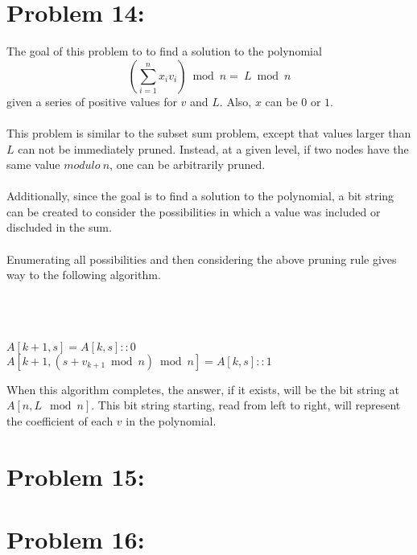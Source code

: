 \documentclass[12pt]{article}
\begin{document}
\section*{Problem 14: }
The goal of this problem to to find a 
solution to the polynomial \[\left(\sum_{i=1}^{n}x_iv_i\right)\bmod n=\ L\bmod n\]
given a series of positive values for $v$ and $L$.  Also, $x$
can be $0$ or $1$.\\\\  
This problem is similar to the subset sum problem, except that
values larger than $L$ can not be immediately pruned.
Instead, at a given level, if two nodes have the same value 
$modulo\ n$, one can be arbitrarily pruned.\\\\
Additionally, since the goal is to find a solution to the
polynomial, a bit string can be created to consider the
possibilities in which a value was included or discluded in
the sum.\\\\
Enumerating all possibilities and then considering the 
above pruning rule gives way to the following algorithm.\\\\
\begin{algorithm}[H]
\\
\\
{
{
{
   $A[k+1,s] = A[k,s]::0$\\
   $A[k+1, (s + v_{k+1}\bmod n)\bmod n] = A[k,s]::1$\\
}
}
}
\end{algorithm}
When this algorithm completes, the answer, if it exists,
will be the bit string at $A[n,L\mod n]$.  This bit string
starting, read from left to right, will represent the 
coefficient of each $v$ in the polynomial.
\section*{Problem 15: }
\section*{Problem 16: }
\end{document}
